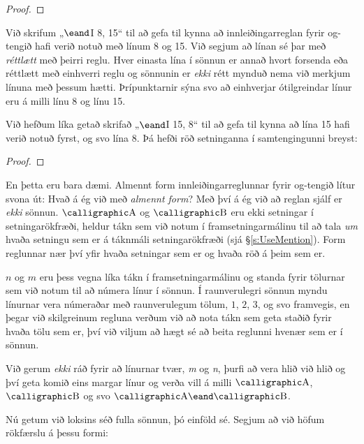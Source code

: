 \begin{proof}
	\have[\vdots] {}{\vdots}
	 
\end{proof}
Við skrifum „$\eand$I 8, 15“ til að gefa til kynna að innleiðingarreglan fyrir og-tengið hafi verið notuð með línum 8 og 15. Við segjum að línan sé þar með \emph{réttlætt} með þeirri reglu. Hver einasta lína í sönnun er annað hvort forsenda eða réttlætt með einhverri reglu og sönnunin er \emph{ekki} rétt mynduð nema við merkjum línuna með þessum hætti. Þrípunktarnir sýna svo að einhverjar ótilgreindar línur eru á milli línu 8 og línu 15.

Við hefðum líka getað skrifað „$\eand$I 15, 8“ til að gefa til kynna að lína 15 hafi verið notuð fyrst, og svo lína 8. Þá hefði röð setninganna í samtengingunni breyst:

\begin{proof}
	\have[\vdots] {}{\vdots}
	 
\end{proof}

En þetta eru bara dæmi. Almennt form innleiðingarreglunnar fyrir og-tengið lítur svona út:
Hvað á ég við með \emph{almennt form}? Með því á ég við að reglan sjálf er \emph{ekki} sönnun. $\meta{A}$ og $\meta{B}$ eru ekki setningar í setningarökfræði, heldur tákn sem við notum í framsetningarmálinu til að tala \emph{um} hvaða setningu sem er á táknmáli setningarökfræði (sjá \S\ref{s:UseMention}). Form reglunnar nær því yfir hvaða setningar sem er og hvaða röð á þeim sem er. 

$n$ og $m$ eru þess vegna líka tákn í framsetningarmálinu og standa fyrir tölurnar sem við notum til að númera línur í sönnun. Í raunverulegri sönnun myndu línurnar vera númeraðar með raunverulegum tölum, $1$, $2$, $3$, og svo framvegis, en þegar við skilgreinum regluna verðum við að nota tákn sem geta staðið fyrir hvaða tölu sem er, því við viljum að hægt sé að beita reglunni hvenær sem er í sönnun. 

Við gerum \emph{ekki} ráð fyrir að línurnar tvær, \emph{m} og \emph{n}, þurfi að vera hlið við hlið og því geta komið eins margar línur og verða vill á milli $\meta{A}$, $\meta{B}$ og svo $\meta{A} \eand \meta{B}$.

Nú getum við loksins séð fulla sönnun, þó einföld sé. Segjum að við höfum rökfærslu á þessu formi:


